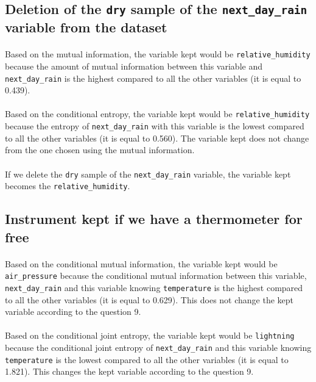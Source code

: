 \documentclass[a4paper, 11pt, oneside]{article}
\begin{document}
\subsection{Deletion of the \texttt{dry} sample of the \texttt{next\_day\_rain} variable from the dataset}

\paragraph{}Based on the mutual information, the variable kept would be \texttt{relative\_humidity} because the amount of mutual information between this variable and \texttt{next\_day\_rain} is the highest compared to all the other variables (it is equal to 0.439).

\paragraph{}Based on the conditional entropy, the variable kept would be \texttt{relative\_humidity} because the entropy of \texttt{next\_day\_rain} with this variable is the lowest compared to all the other variables (it is equal to 0.560). The variable kept does not change from the one chosen using the mutual information.

\paragraph{}If we delete the \texttt{dry} sample of the \texttt{next\_day\_rain} variable, the variable kept becomes the \texttt{relative\_humidity}.

\subsection{Instrument kept if we have a thermometer for free}

\paragraph{}Based on the conditional mutual information, the variable kept would be \texttt{air\_pressure} because the conditional mutual information between this variable, \texttt{next\_day\_rain} and this variable knowing \texttt{temperature} is the highest compared to all the other variables (it is equal to 0.629). This does not change the kept variable according to the question 9.

\paragraph{}Based on the conditional joint entropy, the variable kept would be \texttt{lightning} because the conditional joint entropy of \texttt{next\_day\_rain} and this variable knowing \texttt{temperature} is the lowest compared to all the other variables (it is equal to 1.821). This changes the kept variable according to the question 9.


\end{document}
